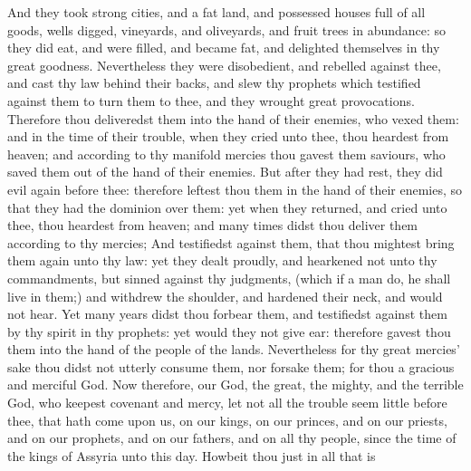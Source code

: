 {And they
took
strong
cities, and a
fat
land, and
possessed
houses
full of all
goods,
wells
digged,
vineyards, and
oliveyards, and
fruit
trees in
abundance: so they did
eat, and were
filled, and became
fat, and
delighted themselves in thy
great
goodness.
Nevertheless they were
disobedient, and
rebelled against thee, and
cast thy
law
behind their
backs, and
slew thy
prophets which
testified against them to
turn them to thee, and they
wrought
great
provocations.
Therefore thou
deliveredst them into the
hand of their
enemies, who
vexed them: and in the
time of their
trouble, when they
cried unto thee, thou
heardest
{} from
heaven; and according to thy
manifold
mercies thou
gavest them
saviours, who
saved them out of the
hand of their
enemies.
But after they had
rest, they
did
evil
again
before thee: therefore
leftest thou them in the
hand of their
enemies, so that they had the
dominion over them: yet when they
returned, and
cried unto thee, thou
heardest
{} from
heaven; and
many
times didst thou
deliver them according to thy
mercies;
And
testifiedst against them, that thou mightest bring them
again unto thy
law: yet they dealt
proudly, and
hearkened not unto thy
commandments, but
sinned against thy
judgments, (which if a
man
do, he shall
live in them;) and
withdrew the
shoulder, and
hardened their
neck, and would not
hear.
Yet
many
years didst thou
forbear them, and
testifiedst against them by thy
spirit
in thy
prophets: yet would they not give
ear: therefore
gavest thou them into the
hand of the
people of the
lands.
Nevertheless for thy
great
mercies’ sake thou
didst not utterly
consume them, nor
forsake them; for thou
{} a
gracious and
merciful
God.
Now therefore, our
God, the
great, the
mighty, and the
terrible
God, who
keepest
covenant and
mercy, let not all the
trouble seem
little
before thee, that hath
come upon us, on our
kings, on our
princes, and on our
priests, and on our
prophets, and on our
fathers, and on all thy
people, since the
time of the
kings of
Assyria unto this
day.
Howbeit thou
{}
just in all that is
}
